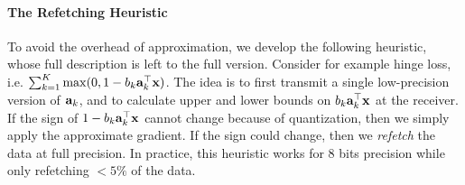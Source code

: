 \vspace{-0.5em}
\paragraph*{The Refetching Heuristic}
To avoid the overhead of approximation, we develop the following heuristic, whose full description is left to the full version. 
Consider for example hinge loss, i.e.  $\sum_{k=1}^K \max(0, 1 - b_k {\bf a}_k^\top {\bf x})$. 
The idea is to 
first transmit a single low-precision version of ${\bf a}_k$, and to  
calculate upper and lower bounds on $b_k {\bf a}_k^\top {\bf x}$ at the receiver.
If the sign of $1-b_k {\bf a}_k^\top {\bf x}$ cannot change because of quantization, then we simply apply the approximate gradient. 
If the sign could change, then we {\em refetch} the data at full precision.
In practice, this heuristic works for 
8 bits precision while only refetching $<5\%$
of the data.


